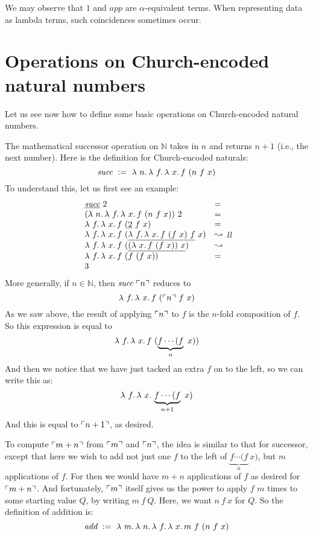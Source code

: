 \noindent We may observe that $1$ and $\textit{app}$ are $\alpha$-equivalent
terms.  When representing data as lambda terms, such coincidences
sometimes occur.

\section{Operations on Church-encoded natural numbers}

Let us see now how to define some basic operations on Church-encoded
natural numbers.

 The mathematical successor
operation on $\mathbb{N}$ takes in $n$
and returns $n+1$ (i.e., the next number).  Here is the definition for
Church-encoded naturals:
\[
\textit{succ}\ :=\ \lam{n}{\lam{f}{\lam{x}{f\ (n\ f\ x)}}}
\]
\noindent To understand this, let us first see an example:
\[
\begin{array}{ll}
  \underline{\textit{succ}}\ 2 & = \\
  (\lambda\ n.\, \lambda\ f.\, \lambda\ x.\, f\ (n\ f\ x))\ 2 & = \\
  \lambda\ f.\, \lambda\ x.\, f\ (\underline{2}\ f\ x) & = \\
  \lambda\ f.\, \lambda\ x.\, f\ (\underline{\lambda\ f.\, \lambda\ x.\, f\ (f\ x)\ f}\ x) & \leadsto \\
  \lambda\ f.\, \lambda\ x.\, f\ (\underline{(\lambda\ x.\, f\ (f\ x))\ x}) & \leadsto \\
  \lambda\ f.\, \lambda\ x.\, f\ (f\ (f\ x)) & = \\
  3
\end{array}{ll}
\]
More generally, if $n\in\mathbb{N}$, then $\textit{succ}\ \ulcorner n \urcorner$ reduces to
\[
\lam{f}{\lam{x}{f\ (\rep{n}\ f\ x)}}
\]
\noindent As we saw above, the result of applying $\ulcorner n \urcorner$ to $f$ is the $n$-fold composition of $f$.  So this
expression is equal to 
\[
\lambda\ f.\, \lambda\ x.\, f\ (\underbrace{f \cdots (f }_{n}\ x))
\]
\noindent And then we notice that we have just tacked an extra $f$ on to the left, so we can write this as:
\[
\lam{f}{\lam{x}{\underbrace{f \cdots (f }_{n+1}\ x)}}
\]
\noindent And this is equal to $\ulcorner n+1 \urcorner$, as desired.

  To compute $\ulcorner m+n \urcorner$ from $\ulcorner m \urcorner$ and $\ulcorner n \urcorner$, the idea is similar to that for successor, except
that here we wish to add not just one $f$ to the left of $\underbrace{f \cdots (f }_{n}\ x)$, but $m$ applications of $f$.  For
then we would have $m+n$ applications of $f$ as desired for $\ulcorner m+n \urcorner$.  And fortunately, $\ulcorner m \urcorner$ itself gives us the power
to apply $f$ $m$ times to some starting value $Q$, by writing $m\ f\ Q$.  Here, we want $n\ f\ x$ for $Q$.  So the definition
of addition is:
\[
\textit{add} \ := \ \lam{m}{\lam{n}{\lam{f}{\lam{x}{m\ f\ (n\ f\ x)}}}}
\]

